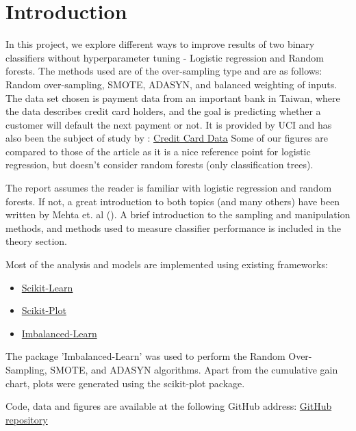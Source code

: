 \section{Introduction}
In this project, we explore different ways to improve results of two binary
classifiers without hyperparameter tuning - Logistic regression and
Random forests. The methods used are of the over-sampling type and are as
follows: Random over-sampling, SMOTE, ADASYN, and balanced weighting of
inputs.
The data set chosen is payment data from an important bank in Taiwan, 
where the data describes credit card holders, and the goal is predicting 
whether a customer will default the next payment or not.
It is provided by UCI and has also been the subject of study by \cite{ComparisonData}: 
\href{https://archive.ics.uci.edu/ml/datasets/default+of+credit+card+clients}{Credit Card Data}
Some of our figures are compared to those of the article as it is a nice
reference point for logistic regression, but doesn't consider random forests
(only classification trees).

The report assumes the reader is familiar with logistic regression and
random forests. If not, a great introduction to both topics (and many others)
have been written by Mehta et. al (\cite{mehta-article}).
A brief introduction to the sampling and manipulation methods, and methods
used to measure classifier performance is included in the theory section.

Most of the analysis and models are implemented using existing frameworks:
\begin{itemize}
\item \href{https://scikit-learn.org/}{Scikit-Learn}
\item \href{https://pypi.org/project/scikit-plot/0.3.7/}{Scikit-Plot}
\item \href{https://imbalanced-learn.org/en/stable/}{Imbalanced-Learn}
\end{itemize}
The package 'Imbalanced-Learn' was used to perform the Random Over-Sampling,
SMOTE, and ADASYN algorithms. Apart from the cumulative gain chart, 
plots were generated using the scikit-plot package.

Code, data and figures are available at the following GitHub address:
\href{https://github.com/geirtul/fys-stk4155/tree/master/project3}{GitHub repository}


